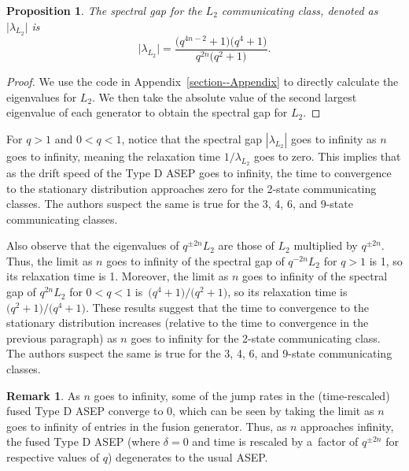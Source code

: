 \documentclass[10pt,a4paper]{amsart}
\numberwithin{equation}{section}
\newtheorem{Proposition}[Theorem]{Proposition}
\theoremstyle{definition}
\newtheorem{Remark}[Theorem]{Remark}
\def\mathcal#1{#1}
\begin{document}
\begin{Proposition}
 \label{SpectralStatement}
 The spectral gap for the $\mathcal{L}_2$ communicating class, denoted as $\lvert \lambda_{\mathcal{L}_2} \rvert$ is
 \[\lvert \lambda_{\mathcal{L}_2} \rvert = \frac{\bigl(q^{4n-2}+1\bigr)\bigl(q^4+1\bigr)}{q^{2n}\bigl(q^2+1\bigr)}.\]
\end{Proposition}
\begin{proof}
\label{SpectralStatement_proof}
We use the code in Appendix~\ref{section--Appendix} to directly calculate the eigenvalues for $\mathcal{L}_2$. We then take the absolute value of the second largest eigenvalue of each generator to obtain the spectral gap for $\mathcal{L}_2$.
\end{proof}

For $q > 1$ and $0 < q < 1$, notice that the spectral gap $|\lambda_{\mathcal{L}_2}|$ goes to infinity as $n$ goes to infinity, meaning the relaxation time $1/\lambda_{\mathcal{L}_2}$ goes to zero. This implies that as the drift speed of the Type D ASEP goes to infinity, the time to convergence to the stationary distribution approaches zero for the 2-state communicating classes. The authors suspect the same is true for the 3, 4, 6, and 9-state communicating classes.

Also observe that the eigenvalues of $q^{\pm 2n} \mathcal{L}_2$ are those of $\mathcal{L}_2$ multiplied by $q^{\pm 2n}$. Thus, the limit as $n$ goes to infinity of the spectral gap of $q^{-2n} \mathcal{L}_2$ for $q > 1$ is 1, so its relaxation time is 1. Moreover, the limit as $n$ goes to infinity of the spectral gap of $q^{2n} \mathcal{L}_2$ for $0 < q < 1$ is~${\bigl(q^4 + 1\bigr)/\bigl(q^2 + 1\bigr)}$, so its relaxation time is $\bigl(q^2 + 1\bigr)/\bigl(q^4 + 1\bigr)$. These results suggest that the time to convergence to the stationary distribution increases (relative to the time to convergence in the previous paragraph) as $n$ goes to infinity for the 2-state communicating class. The authors suspect the same is true for the 3, 4, 6, and 9-state communicating classes.

\begin{Remark}
As $n$ goes to infinity, some of the jump rates in the (time-rescaled) fused Type D ASEP converge to $0$, which can be seen by taking the limit as $n$ goes to infinity of entries in the fusion generator. Thus, as $n$ approaches infinity, the fused Type D ASEP (where $\delta = 0$ and time is rescaled by a~factor of $q^{\pm 2n}$ for respective values of $q$) degenerates to the usual ASEP.
\end{Remark}
\end{document}
